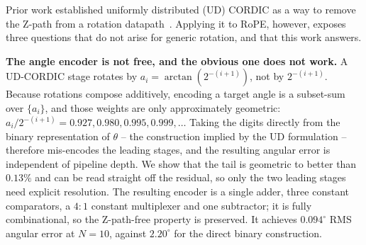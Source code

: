 %
%

Prior work established uniformly distributed (UD) CORDIC as a way to remove the
Z-path from a rotation datapath~\cite{garrido2025ud}. Applying it to RoPE,
however, exposes three questions that do not arise for generic rotation, and
that this work answers.


\textbf{The angle encoder is not free, and the obvious one does not work.}
A UD-CORDIC stage rotates by $a_i = \arctan(2^{-(i+1)})$, not by $2^{-(i+1)}$.
Because rotations compose additively, encoding a target angle is a subset-sum
over $\{a_i\}$, and those weights are only approximately geometric:
$a_i / 2^{-(i+1)} = 0.927, 0.980, 0.995, 0.999, \ldots$ Taking the digits
directly from the binary representation of $\theta$ -- the construction implied
by the UD formulation -- therefore mis-encodes the leading stages, and the
resulting angular error is independent of pipeline depth. We show that the
tail is geometric to better than $0.13\%$ and can be read straight off the
residual, so only the two leading stages need explicit resolution. The
resulting encoder is a single adder, three constant comparators, a $4{:}1$
constant multiplexer and one subtractor; it is fully combinational, so the
Z-path-free property is preserved. It achieves $0.094^{\circ}$ RMS angular
error at $N = 10$, against $2.20^{\circ}$ for the direct binary construction.

